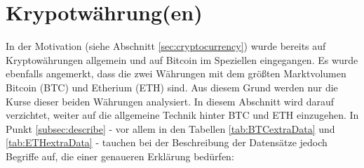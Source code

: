 \section{Krypotwährung(en)}\label{sec:cryptocurrency2}
In der Motivation (siehe Abschnitt \ref{sec:cryptocurrency}) wurde bereits auf Kryptowährungen allgemein und auf Bitcoin im Speziellen eingegangen. Es wurde ebenfalls angemerkt, dass die zwei Währungen mit dem größten Marktvolumen Bitcoin (BTC) und Etherium (ETH) sind. Aus diesem Grund werden nur die Kurse dieser beiden Währungen analysiert. In diesem Abschnitt wird darauf verzichtet, weiter auf die allgemeine Technik hinter BTC und ETH einzugehen. In Punkt \ref{subsec:describe} - vor allem in den Tabellen \ref{tab:BTCextraData} und \ref{tab:ETHextraData} - tauchen bei der Beschreibung der Datensätze jedoch Begriffe auf, die einer genaueren Erklärung bedürfen:
